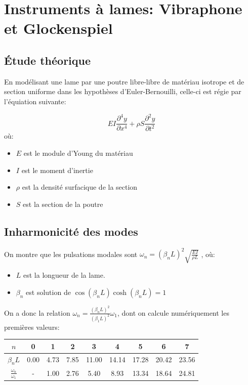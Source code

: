 \documentclass[atiam, article]{rapport} %
\begin{document}
\section{Instruments à lames: Vibraphone et Glockenspiel}
\subsection{Étude théorique}

En modélisant une lame par une poutre libre-libre de matériau isotrope et de section uniforme dans les hypothèses d'Euler-Bernouilli, celle-ci est régie par l'équiation suivante:

$$E I \frac{\partial^4 y}{\partial x^4} + \rho S \frac{\partial^2 y}{\partial t^2} $$
où:
\begin{itemize}
  \item $E$ est le module d'Young du matériau
  \item $I$ est le moment d'inertie
  \item $\rho$ est la densité surfacique de la section
  \item $S$ est la section de la poutre
\end{itemize}

\subsection{Inharmonicité des modes}

On montre que les pulsations modales sont $\omega_n = (\beta_n L)^2 \sqrt{\frac{EI}{\rho L}}$ , où:
\begin{itemize}
  \item $L$ est la longueur de la lame.
  \item $\beta_n$ est solution de $\cos{(\beta_n L)} \cosh{(\beta_n L)} = 1$
\end{itemize}

On a donc la relation $\omega_n = \frac{(\beta_n L)^2}{(\beta_1 L)^2} \omega_1$, dont on calcule numériquement les premières valeurs:
\begin{center}
  \begin{tabular}{ c|c|c|c|c|c|c|c|c } 
    $n$ & 0 & 1 & 2 & 3 & 4 & 5 & 6 & 7 \\
    \hline
    $\beta_n L$ & 0.00 & 4.73 & 7.85 & 11.00 & 14.14 & 17.28 & 20.42 & 23.56 \\
    \hline
    $\frac{\omega_n}{\omega_1}$ & - & 1.00 & 2.76 & 5.40 & 8.93 & 13.34 & 18.64 & 24.81 \\
  \end{tabular}
  \label{table:ratios}
\end{center}
\end{document}
